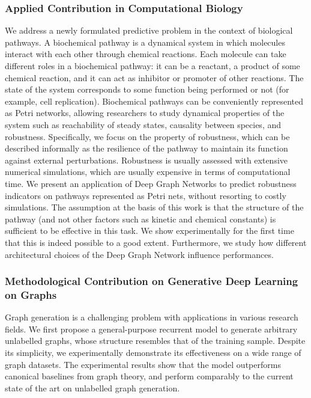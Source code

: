 \subsubsection*{Applied Contribution in Computational Biology}
We address a newly formulated predictive problem in the context of biological pathways. A biochemical pathway is a dynamical system in which molecules interact with each other through chemical reactions. Each molecule can take different roles in a biochemical pathway: it can be a reactant, a product of some chemical reaction, and it can act as inhibitor or promoter of other reactions. The state of the system  corresponds to some function being performed or not (for example, cell replication). Biochemical pathways can be conveniently represented as Petri networks, allowing researchers to study dynamical properties of the system such as reachability of steady states, causality between species, and robustness. Specifically, we focus on the property of robustness, which can be described informally as the resilience of the pathway to maintain its function against external perturbations. Robustness is usually assessed with extensive numerical simulations, which are usually expensive in terms of computational time. We present an application of Deep Graph Networks to predict robustness indicators on pathways represented as Petri nets, without resorting to costly simulations. The assumption at the basis of this work is that the structure of the pathway (and not other factors such as kinetic and chemical constants) is sufficient to be effective in this task. We show experimentally for the first time that this is indeed possible to a good extent. Furthermore, we study how different architectural choices of the Deep Graph Network influence performances.

\subsubsection*{Methodological Contribution on Generative Deep Learning on Graphs}
Graph generation is a challenging problem with applications in various research fields. We first propose a general-purpose recurrent model to generate arbitrary unlabelled graphs, whose structure resembles that of the training sample. Despite its simplicity, we experimentally demonstrate its effectiveness on a wide range of graph datasets. The experimental results show that the model outperforms canonical baselines from graph theory, and perform comparably to the current state of the art on unlabelled graph generation.

